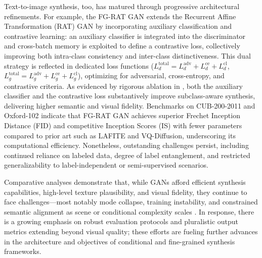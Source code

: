 \documentclass[sigconf]{acmart}
\begin{document}
Text-to-image synthesis, too, has matured through progressive architectural refinements. For example, the FG-RAT GAN extends the Recurrent Affine Transformation (RAT) GAN by incorporating auxiliary classification and contrastive learning: an auxiliary classifier is integrated into the discriminator and cross-batch memory is exploited to define a contrastive loss, collectively improving both intra-class consistency and inter-class distinctiveness. This dual strategy is reflected in dedicated loss functions (\(L_d^\text{total} = L_d^\text{adv} + L_d^\text{ce} + L_d^\text{cl}\), \(L_g^\text{total} = L_g^\text{adv} + L_g^\text{ce} + L_g^\text{cl}\)), optimizing for adversarial, cross-entropy, and contrastive criteria. As evidenced by rigorous ablation in \cite{ref101}, both the auxiliary classifier and the contrastive loss substantively improve subclass-aware synthesis, delivering higher semantic and visual fidelity. Benchmarks on CUB-200-2011 and Oxford-102 indicate that FG-RAT GAN achieves superior Frechet Inception Distance (FID) and competitive Inception Scores (IS) with fewer parameters compared to prior art such as LAFITE and VQ-Diffusion, underscoring its computational efficiency. Nonetheless, outstanding challenges persist, including continued reliance on labeled data, degree of label entanglement, and restricted generalizability to label-independent or semi-supervised scenarios.

Comparative analyses demonstrate that, while GANs afford efficient synthesis capabilities, high-level texture plausibility, and visual fidelity, they continue to face challenges---most notably mode collapse, training instability, and constrained semantic alignment as scene or conditional complexity scales \cite{ref93,ref95,ref101,ref97}. In response, there is a growing emphasis on robust evaluation protocols and pluralistic output metrics extending beyond visual quality; these efforts are fueling further advances in the architecture and objectives of conditional and fine-grained synthesis frameworks.
\end{document}
